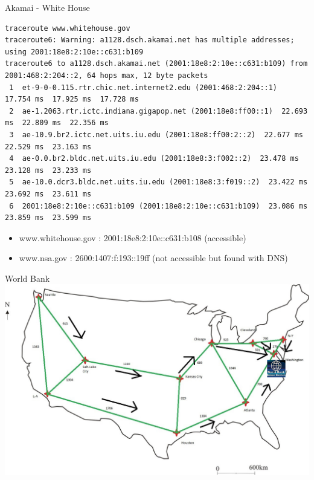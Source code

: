 \documentclass[usenames,dvipsnames]{beamer}
\begin{document}
\begin{frame}[fragile]{Akamai - White House}
\begin{lstlisting}
traceroute www.whitehouse.gov 
traceroute6: Warning: a1128.dsch.akamai.net has multiple addresses; using 2001:18e8:2:10e::c631:b109
traceroute6 to a1128.dsch.akamai.net (2001:18e8:2:10e::c631:b109) from 2001:468:2:204::2, 64 hops max, 12 byte packets
 1  et-9-0-0.115.rtr.chic.net.internet2.edu (2001:468:2:204::1)  17.754 ms  17.925 ms  17.728 ms
 2  ae-1.2063.rtr.ictc.indiana.gigapop.net (2001:18e8:ff00::1)  22.693 ms  22.809 ms  22.356 ms
 3  ae-10.9.br2.ictc.net.uits.iu.edu (2001:18e8:ff00:2::2)  22.677 ms  22.529 ms  23.163 ms
 4  ae-0.0.br2.bldc.net.uits.iu.edu (2001:18e8:3:f002::2)  23.478 ms  23.128 ms  23.233 ms
 5  ae-10.0.dcr3.bldc.net.uits.iu.edu (2001:18e8:3:f019::2)  23.422 ms  23.692 ms  23.611 ms
 6  2001:18e8:2:10e::c631:b109 (2001:18e8:2:10e::c631:b109)  23.086 ms  23.859 ms  23.599 ms
\end{lstlisting}
\begin{itemize}
	\item www.whitehouse.gov : 2001:18e8:2:10e::c631:b108 (accessible)
    \item www.nsa.gov : 2600:1407:f:193::19ff (not accessible but found with DNS)
\end{itemize}
\end{frame}

\begin{frame}{World Bank}
\includegraphics[width=\textwidth]{map_banque.png}
\end{frame}
\end{document}
